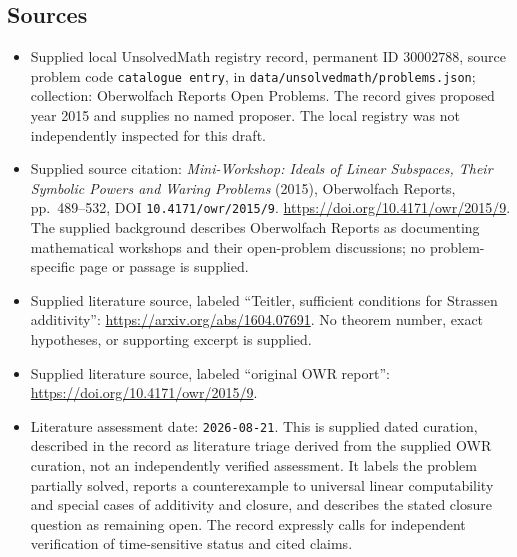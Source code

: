 \documentclass[11pt]{article}
\begin{document}
\subsection{Sources}
\begin{itemize}
\item Supplied local UnsolvedMath registry record, permanent ID \(30002788\), source problem code \texttt{catalogue entry}, in \texttt{data/unsolvedmath/problems.json}; collection: Oberwolfach Reports Open Problems. The record gives proposed year 2015 and supplies no named proposer. The local registry was not independently inspected for this draft.
\item Supplied source citation: \emph{Mini-Workshop: Ideals of Linear Subspaces, Their Symbolic Powers and Waring Problems} (2015), Oberwolfach Reports, pp.~489--532, DOI \texttt{10.4171/owr/2015/9}. \url{https://doi.org/10.4171/owr/2015/9}. The supplied background describes Oberwolfach Reports as documenting mathematical workshops and their open-problem discussions; no problem-specific page or passage is supplied.
\item Supplied literature source, labeled ``Teitler, sufficient conditions for Strassen additivity'': \url{https://arxiv.org/abs/1604.07691}. No theorem number, exact hypotheses, or supporting excerpt is supplied.
\item Supplied literature source, labeled ``original OWR report'': \url{https://doi.org/10.4171/owr/2015/9}.
\item Literature assessment date: \texttt{2026-08-21}. This is supplied dated curation, described in the record as literature triage derived from the supplied OWR curation, not an independently verified assessment. It labels the problem partially solved, reports a counterexample to universal linear computability and special cases of additivity and closure, and describes the stated closure question as remaining open. The record expressly calls for independent verification of time-sensitive status and cited claims.
\end{itemize}
\end{document}
